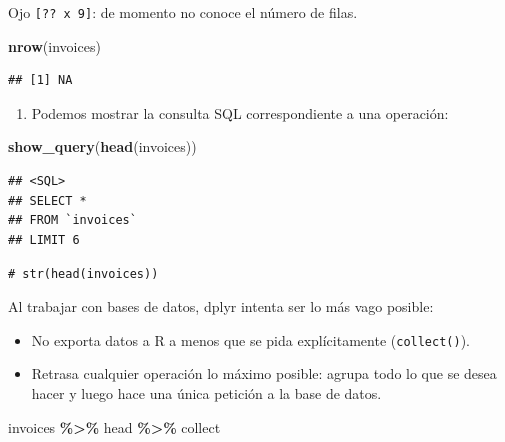 \documentclass[
]{book}
\newenvironment{Shaded}{\begin{snugshade}}{\end{snugshade}}
\newcommand{\CommentTok}[1]{\textcolor[rgb]{0.56,0.35,0.01}{\textit{#1}}}
\newcommand{\FunctionTok}[1]{\textcolor[rgb]{0.13,0.29,0.53}{\textbf{#1}}}
\newcommand{\NormalTok}[1]{#1}
\newcommand{\SpecialCharTok}[1]{\textcolor[rgb]{0.81,0.36,0.00}{\textbf{#1}}}
\providecommand{\tightlist}{%
  \setlength{\itemsep}{0pt}\setlength{\parskip}{0pt}}
\theoremstyle{break}
\theoremstyle{nonumberplain}
\renewcommand{\CommentTok}[1]{\textcolor[rgb]{0.41,0.41,0.41}{\texttt{#1}}}
\begin{document}
Ojo \texttt{{[}??\ x\ 9{]}}: de momento no conoce el número de filas.

\begin{Shaded}
\begin{Highlighting}[]
\FunctionTok{nrow}\NormalTok{(invoices)}
\end{Highlighting}
\end{Shaded}

\begin{verbatim}
## [1] NA
\end{verbatim}

\begin{enumerate}
\def\labelenumi{\arabic{enumi}.}
\tightlist
\item
  Podemos mostrar la consulta SQL correspondiente a una operación:
\end{enumerate}

\begin{Shaded}
\begin{Highlighting}[]
\FunctionTok{show\_query}\NormalTok{(}\FunctionTok{head}\NormalTok{(invoices))}
\end{Highlighting}
\end{Shaded}

\begin{verbatim}
## <SQL>
## SELECT *
## FROM `invoices`
## LIMIT 6
\end{verbatim}

\begin{Shaded}
\begin{Highlighting}[]
\CommentTok{\# str(head(invoices))}
\end{Highlighting}
\end{Shaded}

Al trabajar con bases de datos, dplyr intenta ser lo más vago posible:

\begin{itemize}
\item
  No exporta datos a R a menos que se pida explícitamente (\texttt{collect()}).
\item
  Retrasa cualquier operación lo máximo posible:
  agrupa todo lo que se desea hacer y luego hace una única petición a la base de datos.
\end{itemize}

\begin{Shaded}
\begin{Highlighting}[]
\NormalTok{invoices }\SpecialCharTok{\%\textgreater{}\%}\NormalTok{ head }\SpecialCharTok{\%\textgreater{}\%}\NormalTok{ collect}
\end{Highlighting}
\end{Shaded}
\end{document}
